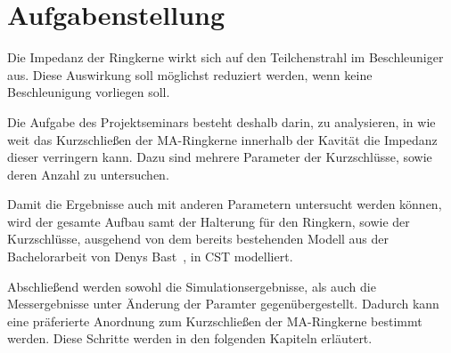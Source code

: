 \section{Aufgabenstellung}
Die Impedanz der Ringkerne wirkt sich auf den Teilchenstrahl im Beschleuniger aus. Diese Auswirkung soll möglichst reduziert werden, wenn keine Beschleunigung vorliegen soll.
\par
Die Aufgabe des Projektseminars besteht deshalb darin, zu analysieren, in wie weit das Kurzschlie\ss{}en der MA-Ringkerne innerhalb der Kavit\"at die Impedanz dieser verringern kann. Dazu sind mehrere Parameter der Kurzschl\"usse, sowie deren Anzahl zu untersuchen.
\par
Damit die Ergebnisse auch mit anderen Parametern untersucht werden k\"onnen, wird der gesamte Aufbau samt der Halterung f\"ur den Ringkern, sowie der Kurzschl\"usse, ausgehend von dem bereits bestehenden Modell aus der Bachelorarbeit von Denys Bast~\citep{bast2017ba}, in CST modelliert. 
\par
Abschlie\ss{}end werden sowohl die Simulationsergebnisse, als auch die Messergebnisse unter \"Anderung der Paramter gegen\"ubergestellt. Dadurch kann eine pr\"aferierte Anordnung zum Kurzschlie\ss{}en der MA-Ringkerne bestimmt werden. Diese Schritte werden in den folgenden Kapiteln erl\"autert. 


